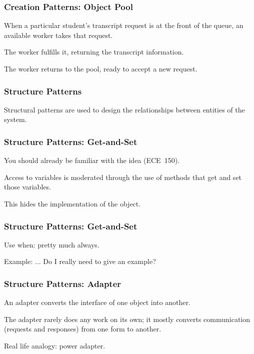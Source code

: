 \begin{frame}
\frametitle{Creation Patterns: Object Pool}
\begin{changemargin}{1cm}


When a particular student's transcript request is at the front of the queue, an available worker takes that request.

The worker fulfills it, returning the transcript information.

The worker returns to the pool, ready to accept a new request.

\end{changemargin}
\end{frame}

\begin{frame}
\frametitle{Structure Patterns}
\begin{changemargin}{1cm}
Structural patterns are used to design the relationships between entities of the system.

\end{changemargin}
\end{frame}


\begin{frame}
\frametitle{Structure Patterns: Get-and-Set}
\begin{changemargin}{1cm}
You should already be familiar with the idea (ECE~150).

Access to variables is moderated through the use of methods that get and set those variables. 

This hides the implementation of the object.

\end{changemargin}
\end{frame}

\begin{frame}
\frametitle{Structure Patterns: Get-and-Set}
\begin{changemargin}{1cm}
Use when: pretty much always.

Example: ... Do I really need to give an example?
\end{changemargin}
\end{frame}


\begin{frame}
\frametitle{Structure Patterns: Adapter}
\begin{changemargin}{1cm}
An adapter converts the interface of one object into another.

The adapter rarely does any work on its own; it mostly converts communication (requests and responses) from one form to another.

Real life analogy: power adapter.

\end{changemargin}
\end{frame}


